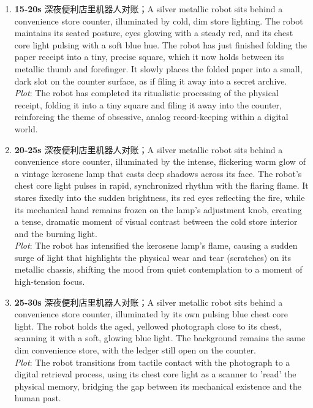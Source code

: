 \documentclass[11pt,a4paper]{article}
\begin{document}
\begin{enumerate}
\item \textbf{15-20s} 深夜便利店里机器人对账；A silver metallic robot sits behind a convenience store counter, illuminated by cold, dim store lighting. The robot maintains its seated posture, eyes glowing with a steady red, and its chest core light pulsing with a soft blue hue. The robot has just finished folding the paper receipt into a tiny, precise square, which it now holds between its metallic thumb and forefinger. It slowly places the folded paper into a small, dark slot on the counter surface, as if filing it away into a secret archive.\\\newline \textit{Plot}: The robot has completed its ritualistic processing of the physical receipt, folding it into a tiny square and filing it away into the counter, reinforcing the theme of obsessive, analog record-keeping within a digital world.
\item \textbf{20-25s} 深夜便利店里机器人对账；A silver metallic robot sits behind a convenience store counter, illuminated by the intense, flickering warm glow of a vintage kerosene lamp that casts deep shadows across its face. The robot's chest core light pulses in rapid, synchronized rhythm with the flaring flame. It stares fixedly into the sudden brightness, its red eyes reflecting the fire, while its mechanical hand remains frozen on the lamp's adjustment knob, creating a tense, dramatic moment of visual contrast between the cold store interior and the burning light.\\\newline \textit{Plot}: The robot has intensified the kerosene lamp's flame, causing a sudden surge of light that highlights the physical wear and tear (scratches) on its metallic chassis, shifting the mood from quiet contemplation to a moment of high-tension focus.
\item \textbf{25-30s} 深夜便利店里机器人对账；A silver metallic robot sits behind a convenience store counter, illuminated by its own pulsing blue chest core light. The robot holds the aged, yellowed photograph close to its chest, scanning it with a soft, glowing blue light. The background remains the same dim convenience store, with the ledger still open on the counter.\\\newline \textit{Plot}: The robot transitions from tactile contact with the photograph to a digital retrieval process, using its chest core light as a scanner to 'read' the physical memory, bridging the gap between its mechanical existence and the human past.

\end{enumerate}
\end{document}

